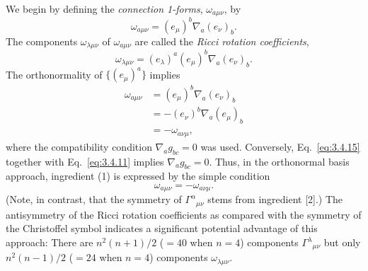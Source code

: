 We begin by defining the \emph{connection 1-forms}, $\omega_{a\mu\nu}$, by
\begin{equation}
  \omega_{a\mu\nu}=(e_\mu)^b\nabla_a(e_\nu)_b.
  \tag{3.4.13}\label{eq:3.4.13}
\end{equation}
The components $\omega_{\lambda\mu\nu}$ of $\omega_{a\mu\nu}$ are called the \emph{Ricci rotation coefficients},
\begin{equation}
  \omega_{\lambda\mu\nu}=(e_\lambda)^a(e_\mu)^b\nabla_a(e_\nu)_b.
  \tag{3.4.14}\label{eq:3.4.14}
\end{equation}
The orthonormality of $\{(e_\mu)^a\}$ implies
\begin{equation}
  \begin{aligned}
    \omega_{a\mu\nu}
    &=(e_\mu)^b\nabla_a(e_\nu)_b\\
    &=-(e_\nu)^b\nabla_a(e_\mu)_b\\
    &=-\omega_{a\nu\mu},
  \end{aligned}
  \tag{3.4.15}\label{eq:3.4.15}
\end{equation}
where the compatibility condition $\nabla_ag_{bc}=0$ was used. Conversely, Eq.~\eqref{eq:3.4.15}
together with Eq.~\eqref{eq:3.4.11} implies $\nabla_ag_{bc}=0$. Thus, in the orthonormal
basis approach, ingredient (1) is expressed by the simple condition
\begin{equation}
  \omega_{a\mu\nu}=-\omega_{a\nu\mu}.
  \tag{3.4.16}\label{eq:3.4.16}
\end{equation}
(Note, in contrast, that the symmetry of $\Gamma^\alpha{}_{\mu\nu}$ stems from ingredient [2].) The
antisymmetry of the Ricci rotation coefficients as compared with the symmetry of the
Christoffel symbol indicates a significant potential advantage of this approach: There
are $n^2(n+1)/2$ ($=40$ when $n=4$) components $\Gamma^\lambda{}_{\mu\nu}$ but only $n^2(n-1)/2$ ($=24$
when $n=4$) components $\omega_{\lambda\mu\nu}$.

